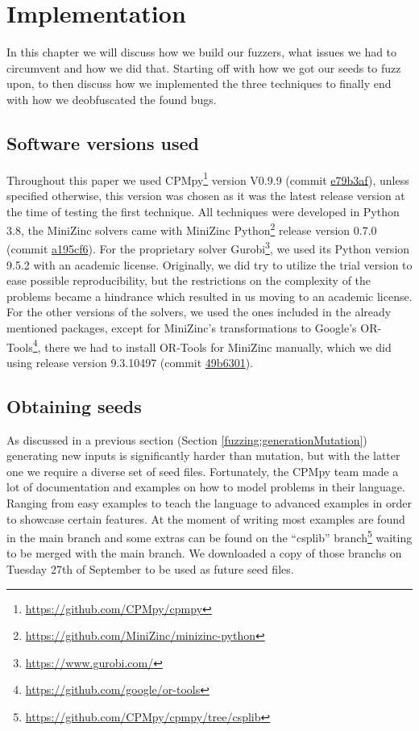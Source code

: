 \chapter{Implementation}
\label{cha:5:impl}
\label{impl:Intro}
In this chapter we will discuss how we build our fuzzers, what issues we had to circumvent and how we did that. Starting off with how we got our seeds to fuzz upon, to then discuss how we implemented the three techniques to finally end with how we deobfuscated the found bugs.

\section{Software versions used}
\label{impl:softwareVersion}
Throughout this paper we used CPMpy\footnote{\url{https://github.com/CPMpy/cpmpy}} version V0.9.9 (commit \href{https://github.com/CPMpy/cpmpy/commit/e79b3afedc934a9437c2ddb3a9f54d7e2d7bd3ee}{e79b3af}), unless specified otherwise, this version was chosen as it was the latest release version at the time of testing the first technique. All techniques were developed in Python 3.8, the MiniZinc solvers came with MiniZinc Python\footnote{\url{https://github.com/MiniZinc/minizinc-python}} release version 0.7.0 (commit \href{https://github.com/MiniZinc/minizinc-python/commit/a195cf63fcfbc98665d70ab64efb5424db25bd7e}{a195cf6}). For the proprietary solver Gurobi\footnote{\url{https://www.gurobi.com/}}, we used its Python version 9.5.2 with an academic license. 
Originally, we did try to utilize the trial version to ease possible reproducibility, but the restrictions on the complexity of the problems became a hindrance which resulted in us moving to an academic license. For the other versions of the solvers, we used the ones included in the already mentioned packages, except for MiniZinc’s transformations to Google’s OR-Tools\footnote{\url{https://github.com/google/or-tools}}, there we had to install OR-Tools for MiniZinc manually, which we did using release version 9.3.10497 (commit \href{https://github.com/google/or-tools/commit/49b6301e1e1e231d654d79b6032e79809868a70e}{49b6301}).


\section{Obtaining seeds}
\label{impl:obtainingSeeds}
As discussed in a previous section (Section \ref{fuzzing:generationMutation}) generating new inputs is significantly harder than mutation, but with the latter one we require a diverse set of seed files. Fortunately, the CPMpy team made a lot of documentation and examples on how to model problems in their language. Ranging from easy examples to teach the language to advanced examples in order to showcase certain features. 
At the moment of writing most examples are found in the main branch and some extras can be found on the “csplib” branch\footnote{\url{https://github.com/CPMpy/cpmpy/tree/csplib}} waiting to be merged with the main branch. We downloaded a copy of those branchs on Tuesday 27th of September to be used as future seed files. 

